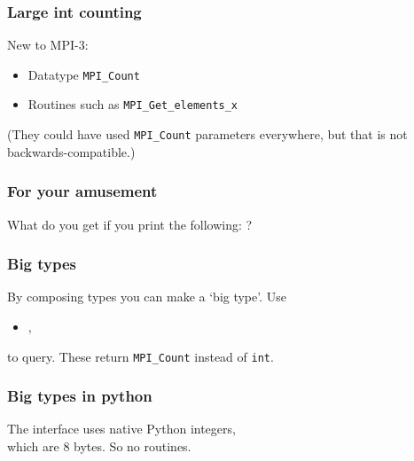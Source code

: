 \begin{frame}[containsverbatim]\frametitle{Large int counting}
  New to MPI-3: 
  \begin{itemize}
  \item Datatype \lstinline{MPI_Count}
  \item Routines such as \lstinline{MPI_Get_elements_x}
  \end{itemize}

  (They could have used \lstinline{MPI_Count} parameters everywhere,
  but that is not backwards-compatible.)
\end{frame}

\begin{frame}[containsverbatim]\frametitle{For your amusement}
What do you get if you print the following:
?
\end{frame}

\begin{frame}[containsverbatim]\frametitle{Big types}
  By composing types you can make a `big type'. Use
  \begin{itemize}
  \item {},
  \end{itemize}
  to query.
  These return \lstinline{MPI_Count} instead of \lstinline{int}.
\end{frame}

\begin{frame}[containsverbatim]\frametitle{Big types in python}
  The  interface uses native Python integers,\\
  which are 8 bytes. So no  routines.
\end{frame}

\endinput

\begin{frame}[containsverbatim]\frametitle{}
\begin{lstlisting}
\end{lstlisting}
\end{frame}

